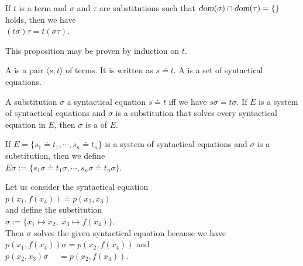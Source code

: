\begin{Proposition} \label{satz:composition}
    If $t$ is a term and $\sigma$ and $\tau$ are substitutions such that  
    $\textsl{dom}(\sigma) \cap \textsl{dom}(\tau) = \{\}$ holds, then we have
    \\[0.2cm]
    \hspace*{1.3cm} $(t \sigma)\tau = t (\sigma\tau)$.
    \eox
\end{Proposition}
This proposition may be proven by induction on $t$.

\begin{Definition} 
  A   is a pair $\langle s, t \rangle$ of terms.
  It is written as $s \doteq t$. 
  A   is a set of syntactical
  equations.
  \eox
\end{Definition}


\begin{Definition}[Unifier]
  A substitution $\sigma$  a syntactical equation $s \doteq t$ iff we have $s\sigma = t\sigma$.
  If $E$ is a system of syntactical equations and $\sigma$ is a substitution that solves
  every syntactical equation in $E$, then $\sigma$ is a    of $E$.
  \eox
\end{Definition}

\noindent
If $E = \{ s_1 \doteq t_1, \cdots, s_n \doteq t_n \}$ is a system of syntactical equations and $\sigma$ is a
substitution, then we define
\\[0.2cm]
\hspace*{1.3cm}  $E\sigma := \{ s_1\sigma \doteq t_1\sigma, \cdots, s_n\sigma \doteq t_n\sigma \}$.
\vspace{0.3cm}

\exampleEng
Let us consider the syntactical equation
\\[0.2cm]
\hspace*{1.3cm}
$p(x_1, f(x_4)) \doteq p( x_2, x_3)$
\\[0.2cm]
and define the substitution
\\[0.2cm]
\hspace*{1.3cm}
$\sigma := \{ x_1 \mapsto x_2,\; x_3 \mapsto f(x_4) \}$.
\\[0.2cm]
Then $\sigma$ solves the given syntactical equation because we have
\\[0.2cm]
\hspace*{1.3cm}
$p(x_1, f(x_4))\sigma = p(x_2, f(x_4))$ \quad and \quad \\[0.2cm]
\hspace*{1.3cm}
$p(x_2, x_3)\sigma \;\quad = p(x_2, f(x_4))$.  \eox

